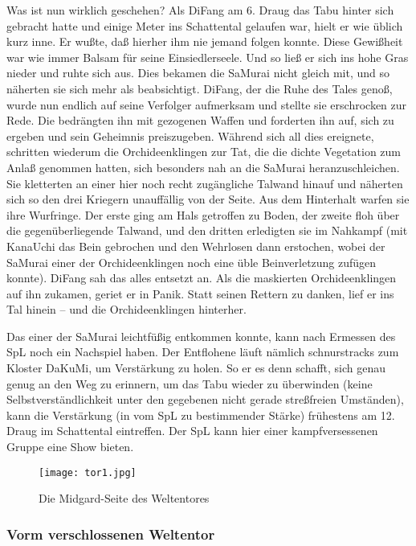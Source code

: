\documentclass[
a4paper,
twoside,
DIV=calc,
BCOR=4mm,
fontsize=9pt,
twocolumn=on,
titlepage=on,
parskip=half
]{scrartcl}
\begin{document}
Was ist nun wirklich geschehen? Als DiFang am 6. Draug das Tabu hinter
sich gebracht hatte und einige Meter ins Schattental gelaufen war,
hielt er wie üblich kurz inne. Er wußte, daß hierher ihm nie jemand
folgen konnte. Diese Gewißheit war wie immer Balsam für seine
Einsiedlerseele. Und so ließ er sich ins hohe Gras nieder und ruhte
sich aus. Dies bekamen die SaMurai nicht gleich mit, und so näherten
sie sich mehr als beabsichtigt. DiFang, der die Ruhe des Tales genoß,
wurde nun endlich auf seine Verfolger aufmerksam und stellte sie
erschrocken zur Rede. Die bedrängten ihn mit gezogenen Waffen und
forderten ihn auf, sich zu ergeben und sein Geheimnis
preiszugeben. Während sich all dies ereignete, schritten wiederum die
Orchideenklingen zur Tat, die die dichte Vegetation zum Anlaß genommen
hatten, sich besonders nah an die SaMurai heranzuschleichen. Sie
kletterten an einer hier noch recht zugängliche Talwand hinauf und
näherten sich so den drei Kriegern unauffällig von der Seite. Aus dem
Hinterhalt warfen sie ihre Wurfringe. Der erste ging am Hals getroffen
zu Boden, der zweite floh über die gegenüberliegende Talwand, und den
dritten erledigten sie im Nahkampf (mit KanaUchi das Bein gebrochen
und den Wehrlosen dann erstochen, wobei der SaMurai einer der
Orchideenklingen noch eine üble Beinverletzung zufügen konnte). DiFang
sah das alles entsetzt an. Als die maskierten Orchideenklingen auf ihn
zukamen, geriet er in Panik. Statt seinen Rettern zu danken, lief er
ins Tal hinein -- und die Orchideenklingen hinterher.

Das einer der SaMurai leichtfüßig entkommen konnte, kann nach Ermessen
des SpL noch ein Nachspiel haben. Der Entflohene läuft nämlich
schnurstracks zum Kloster DaKuMi, um Verstärkung zu holen. So er es
denn schafft, sich genau genug an den Weg zu erinnern, um das Tabu
wieder zu überwinden (keine Selbstverständlichkeit unter den gegebenen
nicht gerade streßfreien Umständen), kann die Verstärkung (in vom SpL
zu bestimmender Stärke) frühestens am 12. Draug im Schattental
eintreffen. Der SpL kann hier einer kampfversessenen Gruppe eine Show
bieten.

\begin{figure*}[t]
  \centering
  \texttt{[image: tor1.jpg]}
  \caption{Die Midgard-Seite des Weltentores}
  \label{fig:tor1}
\end{figure*}

\subsubsection{Vorm verschlossenen Weltentor}
\end{document}
